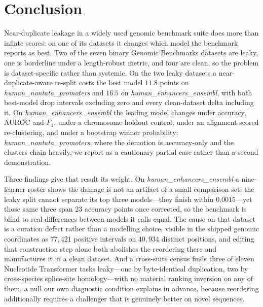 \documentclass[webpdf,modern,large,namedate]{oup-authoring-template}%
\begin{document}
\section{Conclusion}\label{sec:conclusion}

Near-duplicate leakage in a widely used genomic benchmark suite does more than inflate scores: on one of its datasets it changes which model the benchmark reports as best. Two of the seven binary Genomic Benchmarks datasets are leaky, one is borderline under a length-robust metric, and four are clean, so the problem is dataset-specific rather than systemic. On the two leaky datasets a near-duplicate-aware re-split costs the best model $11.8$ points on \textit{human\_nontata\_promoters} and $16.5$ on \textit{human\_enhancers\_ensembl}, with both best-model drop intervals excluding zero and every clean-dataset delta including it. On \textit{human\_enhancers\_ensembl} the leading model changes under accuracy, AUROC and $F_1$, under a chromosome-holdout control, under an alignment-scored re-clustering, and under a bootstrap winner probability; \textit{human\_nontata\_promoters}, where the demotion is accuracy-only and the clusters chain heavily, we report as a cautionary partial case rather than a second demonstration.

Three findings give that result its weight. On \textit{human\_enhancers\_ensembl} a nine-learner roster shows the damage is not an artifact of a small comparison set: the leaky split cannot separate its top three models---they finish within $0.0015$---yet those same three span $23$ accuracy points once corrected, so the benchmark is blind to real differences between models it calls equal. The cause on that dataset is a curation defect rather than a modelling choice, visible in the shipped genomic coordinates as $77{,}421$ positive intervals on $40{,}934$ distinct positions, and editing that construction step alone both abolishes the reordering there and manufactures it in a clean dataset. And a cross-suite census finds three of eleven Nucleotide Transformer tasks leaky---one by byte-identical duplication, two by cross-species splice-site homology---with no material ranking inversion on any of them, a null our own diagnostic condition explains in advance, because reordering additionally requires a challenger that is genuinely better on novel sequences.
\end{document}
